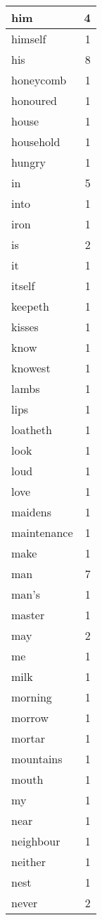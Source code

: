 \begin{center}
\begin{longtable}{l|r}
him & 4\\ \hline 
himself & 1\\ \hline 
his & 8\\ \hline 
honeycomb & 1\\ \hline 
honoured & 1\\ \hline 
house & 1\\ \hline 
household & 1\\ \hline 
hungry & 1\\ \hline 
in & 5\\ \hline 
into & 1\\ \hline 
iron & 1\\ \hline 
is & 2\\ \hline 
it & 1\\ \hline 
itself & 1\\ \hline 
keepeth & 1\\ \hline 
kisses & 1\\ \hline 
know & 1\\ \hline 
knowest & 1\\ \hline 
lambs & 1\\ \hline 
lips & 1\\ \hline 
loatheth & 1\\ \hline 
look & 1\\ \hline 
loud & 1\\ \hline 
love & 1\\ \hline 
maidens & 1\\ \hline 
maintenance & 1\\ \hline 
make & 1\\ \hline 
man & 7\\ \hline 
man's & 1\\ \hline 
master & 1\\ \hline 
may & 2\\ \hline 
me & 1\\ \hline 
milk & 1\\ \hline 
morning & 1\\ \hline 
morrow & 1\\ \hline 
mortar & 1\\ \hline 
mountains & 1\\ \hline 
mouth & 1\\ \hline 
my & 1\\ \hline 
near & 1\\ \hline 
neighbour & 1\\ \hline 
neither & 1\\ \hline 
nest & 1\\ \hline 
never & 2\\ \hline 

\end{longtable}
\end{center}
